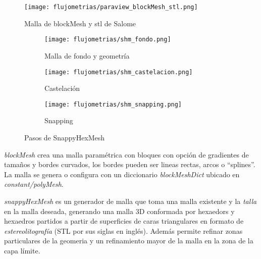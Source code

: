 \begin{figure}
    \centering
    \texttt{[image: flujometrias/paraview\_blockMesh\_stl.png]}
    \caption{Malla de blockMesh y stl de Salome}\label{fig:paraview_blockMesh_stl}
\end{figure}

\begin{figure}[t!]
    \centering
    \begin{subfigure}[t]{0.5\textwidth}
        \centering
        \texttt{[image: flujometrias/shm\_fondo.png]}
        \caption{Malla de fondo y geometría}
    \end{subfigure}%
    \begin{subfigure}[t]{0.5\textwidth}
        \centering
        \texttt{[image: flujometrias/shm\_castelacion.png]}
        \caption{Castelación}
    \end{subfigure}
    \begin{subfigure}[t]{0.5\textwidth}
        \centering
        \texttt{[image: flujometrias/shm\_snapping.png]}
        \caption{Snapping}
    \end{subfigure}
    \caption{Pasos de SnappyHexMesh\parencite{shm_steps}}\label{fig:openfoam_shm_pasos}
\end{figure}


\emph{blockMesh} crea una malla paramétrica con bloques con opción de gradientes
de tamaños y bordes curvados, los bordes pueden ser lineas rectas, arcos o
``splines''.
%
La malla se genera o configura con un diccionario \emph{blockMeshDict} ubicado
en \emph{constant/polyMesh}.

\emph{snappyHexMesh} es un generador de malla que toma una malla existente y la
\emph{talla} en la malla deseada, generando una malla 3D conformada por
hexaedors y hexaedros partidos a partir de superficies de caras triangulares en
formato de \emph{estereolitografía} (STL por sus siglas en inglés).
%
Además permite refinar zonas particulares de la geomeria y un refinamiento mayor
de la malla en la zona de la capa límite.




